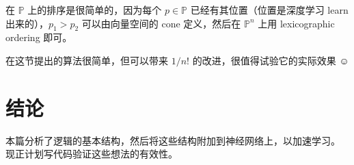 \documentclass[orivec]{llncs}
\begin{document}
在 $\mathbb{P}$ 上的排序是很简单的，因为每个 $p \in \mathbb{P}$ 已经有其位置（位置是深度学习 learn 出来的），$p_1 > p_2$ 可以由向量空间的 cone 定义，然后在 $\mathbb{P}^n$ 上用 lexicographic ordering 即可。

在这节提出的算法很简单，但可以带来 $1/n!$ 的改进，很值得试验它的实际效果 $\smiley$

\section{结论}

本篇分析了逻辑的基本结构，然后将这些结构附加到神经网络上，以加速学习。 现正计划写代码验证这些想法的有效性。
\end{document}

